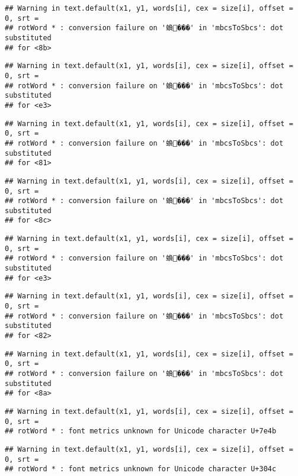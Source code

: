 \documentclass[]{article}
\begin{document}
\begin{verbatim}
## Warning in text.default(x1, y1, words[i], cex = size[i], offset = 0, srt =
## rotWord * : conversion failure on '蝜���' in 'mbcsToSbcs': dot substituted
## for <8b>
\end{verbatim}

\begin{verbatim}
## Warning in text.default(x1, y1, words[i], cex = size[i], offset = 0, srt =
## rotWord * : conversion failure on '蝜���' in 'mbcsToSbcs': dot substituted
## for <e3>
\end{verbatim}

\begin{verbatim}
## Warning in text.default(x1, y1, words[i], cex = size[i], offset = 0, srt =
## rotWord * : conversion failure on '蝜���' in 'mbcsToSbcs': dot substituted
## for <81>
\end{verbatim}

\begin{verbatim}
## Warning in text.default(x1, y1, words[i], cex = size[i], offset = 0, srt =
## rotWord * : conversion failure on '蝜���' in 'mbcsToSbcs': dot substituted
## for <8c>
\end{verbatim}

\begin{verbatim}
## Warning in text.default(x1, y1, words[i], cex = size[i], offset = 0, srt =
## rotWord * : conversion failure on '蝜���' in 'mbcsToSbcs': dot substituted
## for <e3>
\end{verbatim}

\begin{verbatim}
## Warning in text.default(x1, y1, words[i], cex = size[i], offset = 0, srt =
## rotWord * : conversion failure on '蝜���' in 'mbcsToSbcs': dot substituted
## for <82>
\end{verbatim}

\begin{verbatim}
## Warning in text.default(x1, y1, words[i], cex = size[i], offset = 0, srt =
## rotWord * : conversion failure on '蝜���' in 'mbcsToSbcs': dot substituted
## for <8a>
\end{verbatim}

\begin{verbatim}
## Warning in text.default(x1, y1, words[i], cex = size[i], offset = 0, srt =
## rotWord * : font metrics unknown for Unicode character U+7e4b
\end{verbatim}

\begin{verbatim}
## Warning in text.default(x1, y1, words[i], cex = size[i], offset = 0, srt =
## rotWord * : font metrics unknown for Unicode character U+304c
\end{verbatim}
\end{document}
